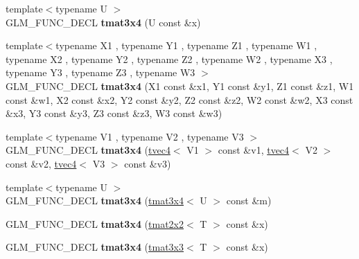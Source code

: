 \begin{DoxyCompactItemize}
\item 
\hypertarget{structglm_1_1detail_1_1tmat3x4_a8646de527d6da9c9c6677f63fee87a5a}{{\footnotesize template$<$typename U $>$ }\\G\-L\-M\-\_\-\-F\-U\-N\-C\-\_\-\-D\-E\-C\-L {\bfseries tmat3x4} (U const \&x)}\label{structglm_1_1detail_1_1tmat3x4_a8646de527d6da9c9c6677f63fee87a5a}

\item 
\hypertarget{structglm_1_1detail_1_1tmat3x4_a79731d96e3616675c81636a16ddffa38}{{\footnotesize template$<$typename X1 , typename Y1 , typename Z1 , typename W1 , typename X2 , typename Y2 , typename Z2 , typename W2 , typename X3 , typename Y3 , typename Z3 , typename W3 $>$ }\\G\-L\-M\-\_\-\-F\-U\-N\-C\-\_\-\-D\-E\-C\-L {\bfseries tmat3x4} (X1 const \&x1, Y1 const \&y1, Z1 const \&z1, W1 const \&w1, X2 const \&x2, Y2 const \&y2, Z2 const \&z2, W2 const \&w2, X3 const \&x3, Y3 const \&y3, Z3 const \&z3, W3 const \&w3)}\label{structglm_1_1detail_1_1tmat3x4_a79731d96e3616675c81636a16ddffa38}

\item 
\hypertarget{structglm_1_1detail_1_1tmat3x4_a6c89bd96cf630d7f6053e2239ddf240d}{{\footnotesize template$<$typename V1 , typename V2 , typename V3 $>$ }\\G\-L\-M\-\_\-\-F\-U\-N\-C\-\_\-\-D\-E\-C\-L {\bfseries tmat3x4} (\hyperlink{structglm_1_1detail_1_1tvec4}{tvec4}$<$ V1 $>$ const \&v1, \hyperlink{structglm_1_1detail_1_1tvec4}{tvec4}$<$ V2 $>$ const \&v2, \hyperlink{structglm_1_1detail_1_1tvec4}{tvec4}$<$ V3 $>$ const \&v3)}\label{structglm_1_1detail_1_1tmat3x4_a6c89bd96cf630d7f6053e2239ddf240d}

\item 
\hypertarget{structglm_1_1detail_1_1tmat3x4_a0889fe0c89c149b320bf3b40393e20b5}{{\footnotesize template$<$typename U $>$ }\\G\-L\-M\-\_\-\-F\-U\-N\-C\-\_\-\-D\-E\-C\-L {\bfseries tmat3x4} (\hyperlink{structglm_1_1detail_1_1tmat3x4}{tmat3x4}$<$ U $>$ const \&m)}\label{structglm_1_1detail_1_1tmat3x4_a0889fe0c89c149b320bf3b40393e20b5}

\item 
\hypertarget{structglm_1_1detail_1_1tmat3x4_a3488e8e002728294342554bfc8ce9427}{G\-L\-M\-\_\-\-F\-U\-N\-C\-\_\-\-D\-E\-C\-L {\bfseries tmat3x4} (\hyperlink{structglm_1_1detail_1_1tmat2x2}{tmat2x2}$<$ T $>$ const \&x)}\label{structglm_1_1detail_1_1tmat3x4_a3488e8e002728294342554bfc8ce9427}

\item 
\hypertarget{structglm_1_1detail_1_1tmat3x4_ae4cdbc4c75ed8fa4bc5b8f1c76f914a7}{G\-L\-M\-\_\-\-F\-U\-N\-C\-\_\-\-D\-E\-C\-L {\bfseries tmat3x4} (\hyperlink{structglm_1_1detail_1_1tmat3x3}{tmat3x3}$<$ T $>$ const \&x)}\label{structglm_1_1detail_1_1tmat3x4_ae4cdbc4c75ed8fa4bc5b8f1c76f914a7}


\end{DoxyCompactItemize}
